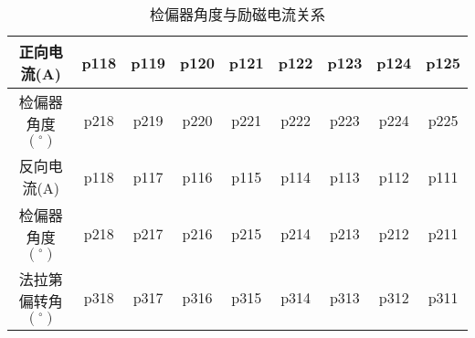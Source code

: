 \newpage
\begin{table}[H]
    \centering
    \begin{tabular}{|c|c|c|c|c|c|c|c|c|}
        \hline
        正向电流(A)  & p118 & p119 & p120 & p121 & p122 & p123  & p124  & p125 \\\hline
        检偏器角度$({}^{\circ})$ & p218 & p219 & p220 & p221 & p222 & p223 & p224 & p225 \\\hline
        反向电流(A)  & p118  & p117 & p116 & p115 & p114 & p113 & p112 & p111 \\\hline
        检偏器角度$({}^{\circ})$ & p218 & p217 & p216 & p215 & p214 & p213 & p212 & p211 \\\hline
        法拉第偏转角$({}^{\circ})$ & p318 & p317 & p316 & p315 & p314 & p313 & p312 & p311 \\\hline
    \end{tabular}
    \caption{检偏器角度与励磁电流关系}
\end{table}
